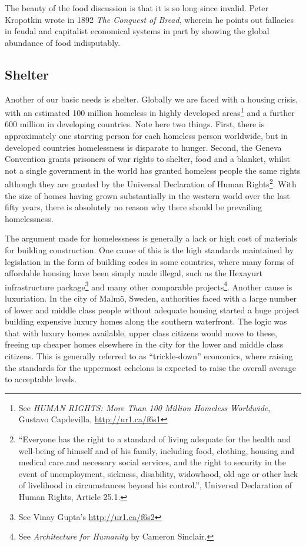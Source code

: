 The beauty of the food discussion is that it is so long since invalid. Peter
Kropotkin wrote in 1892 \textit{The Conquest of Bread}, wherein he points out
fallacies in feudal and capitalist economical systems in part by showing the
global abundance of food indisputably.


\subsection{Shelter}
\label{s:artificial_scarcity:burning_bridges:shelter}

Another of our basic needs is shelter. Globally we are faced with a housing
crisis, with an estimated 100 million homeless in highly developed
areas\footnote{See \textit{HUMAN RIGHTS: More Than 100 Million Homeless
Worldwide}, Gustavo Capdevilla,
\url{http://ur1.ca/f6s1}} and a further 600 million in
developing countries. Note here two things. F\hbox{}irst, there is 
approximately one starving person for each homeless person worldwide, but in
developed countries homelessness is disparate to hunger. Second, the Geneva
Convention grants prisoners of war rights to shelter, food and a blanket, 
whilst not a single government in the world has granted homeless people the 
same rights although they are granted by the Universal Declaration of Human
Rights\footnote{``Everyone has the right to a standard of living adequate for
the health and well-being of himself and of his family, including food,
clothing, housing and medical care and necessary social services, and the right
to security in the event of unemployment, sickness, disability, widowhood, old
age or other lack of livelihood in circumstances beyond his control.'',
Universal Declaration of Human Rights, Article 25.1.}. With the size of homes
having grown substantially in the western world over the last f\hbox{}ifty
years, there is absolutely no reason why there should be prevailing
homelessness. 

The argument made for homelessness is generally a lack or high cost of 
materials for building construction. One cause of this is the high standards
maintained by legislation in the form of building codes in some countries, 
where many forms of af\hbox{}fordable housing have been simply made illegal,
such as the Hexayurt infrastructure package\footnote{See Vinay Gupta's
\url{http://ur1.ca/f6s2}} and many other comparable projects\footnote{See
\textit{Architecture for Humanity} by Cameron Sinclair.}. Another cause is
luxuriation. In the city of Malmö, Sweden, authorities faced with a large 
number of lower and middle class people without adequate housing started a huge
project building expensive luxury homes along the southern waterfront. The 
logic was that with luxury homes available, upper class citizens would move to
these, freeing up cheaper homes elsewhere in the city for the lower and middle
class citizens. This is generally referred to as ``trickle-down'' economics,
where raising the standards for the uppermost echelons is expected to raise the
overall average to acceptable levels. 

